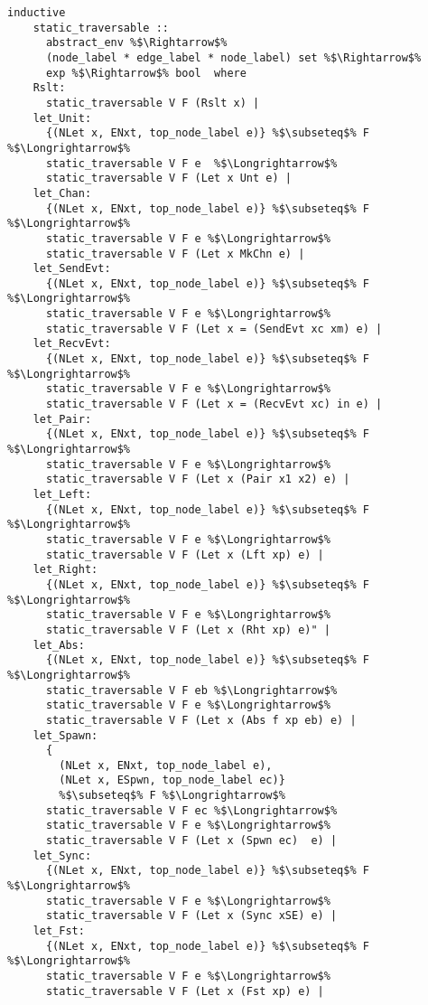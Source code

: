 \documentclass{article}
\begin{document}
\begin{lstlisting}[style=codestyle1, escapechar=\%]
  inductive
    static_traversable ::
      abstract_env %$\Rightarrow$%
      (node_label * edge_label * node_label) set %$\Rightarrow$%
      exp %$\Rightarrow$% bool  where
    Rslt:
      static_traversable V F (Rslt x) |
    let_Unit:
      {(NLet x, ENxt, top_node_label e)} %$\subseteq$% F %$\Longrightarrow$%
      static_traversable V F e  %$\Longrightarrow$%
      static_traversable V F (Let x Unt e) |
    let_Chan:
      {(NLet x, ENxt, top_node_label e)} %$\subseteq$% F %$\Longrightarrow$%
      static_traversable V F e %$\Longrightarrow$%
      static_traversable V F (Let x MkChn e) |
    let_SendEvt:
      {(NLet x, ENxt, top_node_label e)} %$\subseteq$% F %$\Longrightarrow$%
      static_traversable V F e %$\Longrightarrow$%
      static_traversable V F (Let x = (SendEvt xc xm) e) |
    let_RecvEvt:
      {(NLet x, ENxt, top_node_label e)} %$\subseteq$% F %$\Longrightarrow$%
      static_traversable V F e %$\Longrightarrow$%
      static_traversable V F (Let x = (RecvEvt xc) in e) |
    let_Pair:
      {(NLet x, ENxt, top_node_label e)} %$\subseteq$% F %$\Longrightarrow$%
      static_traversable V F e %$\Longrightarrow$%
      static_traversable V F (Let x (Pair x1 x2) e) |
    let_Left:
      {(NLet x, ENxt, top_node_label e)} %$\subseteq$% F %$\Longrightarrow$%
      static_traversable V F e %$\Longrightarrow$%
      static_traversable V F (Let x (Lft xp) e) |
    let_Right:
      {(NLet x, ENxt, top_node_label e)} %$\subseteq$% F %$\Longrightarrow$%
      static_traversable V F e %$\Longrightarrow$%
      static_traversable V F (Let x (Rht xp) e)" |
    let_Abs:
      {(NLet x, ENxt, top_node_label e)} %$\subseteq$% F %$\Longrightarrow$%
      static_traversable V F eb %$\Longrightarrow$%
      static_traversable V F e %$\Longrightarrow$%
      static_traversable V F (Let x (Abs f xp eb) e) |
    let_Spawn:
      {
        (NLet x, ENxt, top_node_label e),
        (NLet x, ESpwn, top_node_label ec)}
        %$\subseteq$% F %$\Longrightarrow$%
      static_traversable V F ec %$\Longrightarrow$%
      static_traversable V F e %$\Longrightarrow$%
      static_traversable V F (Let x (Spwn ec)  e) |
    let_Sync:
      {(NLet x, ENxt, top_node_label e)} %$\subseteq$% F %$\Longrightarrow$%
      static_traversable V F e %$\Longrightarrow$%
      static_traversable V F (Let x (Sync xSE) e) |
    let_Fst:
      {(NLet x, ENxt, top_node_label e)} %$\subseteq$% F %$\Longrightarrow$%
      static_traversable V F e %$\Longrightarrow$%
      static_traversable V F (Let x (Fst xp) e) |

\end{lstlisting}
\end{document}
